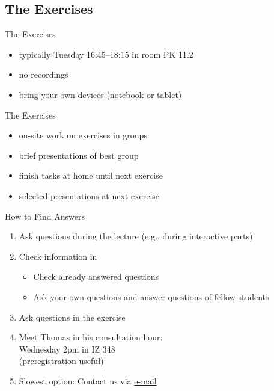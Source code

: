 \subsection{The Exercises}
\begin{frame}{\insertsubsection}
	\begin{fancycolumns}
		\begin{definition}{The Exercises}
			\begin{itemize}
				\item typically Tuesday 16:45--18:15 in room PK 11.2
				\item no recordings
				\item bring your own devices (notebook or tablet)
			\end{itemize}
		\end{definition}
		\begin{note}{The Exercises}
			\begin{itemize}
				\item on-site work on exercises in groups
				\item brief presentations of best group
				\item finish tasks at home until next exercise
				\item selected presentations at next exercise
			\end{itemize}
		\end{note}
		\nextcolumn
		\begin{definition}{How to Find Answers}
			\begin{enumerate}
				\item<+-> Ask questions during the lecture (e.g., during interactive parts)
				\item<+-> Check information in \StudIP
				\begin{itemize}
					\item Check already answered questions
					\item Ask your own questions and answer questions of fellow students
				\end{itemize}
				\item<+-> Ask questions in the exercise
				\item<+-> Meet Thomas in his consultation hour:\\
					Wednesday 2pm in IZ 348\\(preregistration useful)
				\item<+-> Slowest option: Contact us via  \href{mailto:chico.sundermann@tu-braunschweig.de?cc=raphael.dunkel@tu-braunschweig.de,thomas.thuem@tu-braunschweig.de&subject=[SE2]}{e-mail}
			\end{enumerate}
		\end{definition}
	\end{fancycolumns}
\end{frame}
